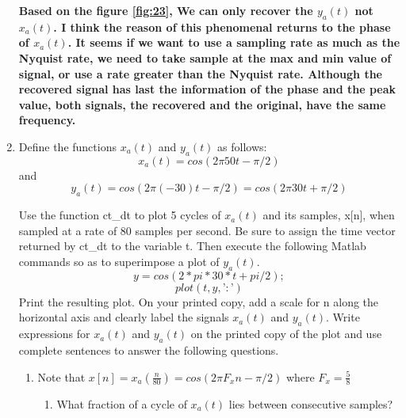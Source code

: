 \documentclass[12pt]{article}
\begin{document}
\begin{enumerate}
\begin{enumerate}
\end{enumerate}

\textbf{Based on the figure \ref{fig:23}, We can only recover the $y_a(t)$ not $x_a(t)$. I think the reason of this phenomenal returns to the phase of $x_a(t)$. It seems if we want to use a sampling rate as much as the Nyquist rate, we need to take sample at the max and min value of signal, or use a rate greater than the Nyquist rate. Although the recovered signal has last the information of the phase and the peak value, both signals, the recovered and the original, have the same frequency.}


\item Define the functions $x_a(t)$ and $y_a(t)$ as follows:
$$
x_a(t) = cos(2\pi50t - \pi/2) 
$$
and 
$$
y_a(t) = cos(2\pi(- 30)t - \pi/2) = cos(2\pi30t + \pi/2)
$$

Use the function ct\_dt to plot 5 cycles of $x_a(t)$ and its samples, x[n], when sampled at a rate of 80 samples per second. Be sure to assign the time vector returned by ct\_dt to the variable t. Then execute the following Matlab commands so as to superimpose a plot of $y_a(t)$.
$$
     y = cos(2*pi*30*t + pi/2);
     $$
     $$
     plot(t,y,’:’)
     $$
Print the resulting plot. On your printed copy, add a scale for n along the horizontal axis and clearly label the signals $x_a(t)$ and $y_a(t)$. Write expressions for $x_a(t)$ and $y_a(t)$ on the printed copy of the plot and use complete sentences to answer the following questions.

\begin{enumerate}
\begin{figure}[H]
    \centering
    \begin{minipage}[b]{0.7\textwidth}
        \texttt{[image: images/31.jpg]}
    \end{minipage}
    \caption{The plot of $x_a(t)$, $y_a(t)$, x[n], and y[n].}
    \label{fig:31}
\end{figure}
\item Note that $x[n] = x_a(\frac{n}{80}) = cos(2\pi F_x n-\pi/2)$ where $F_x = \frac{5}{8}$
\begin{enumerate}



\item What fraction of a cycle of $x_a(t)$ lies between consecutive samples?


\end{enumerate}
\end{enumerate}
\end{enumerate}
\end{document}
